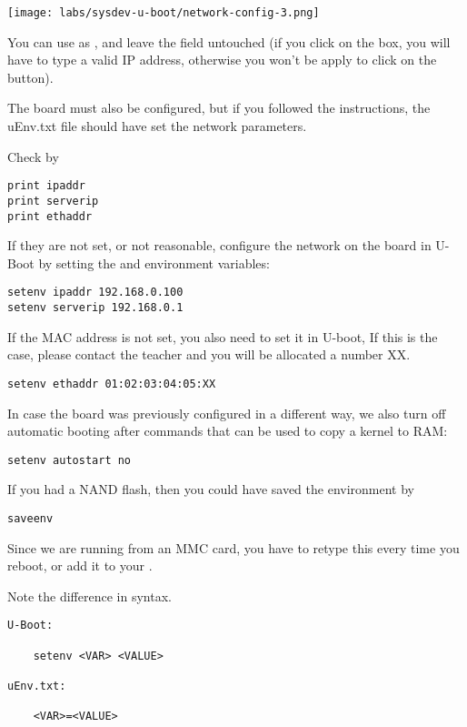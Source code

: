 \begin{center}
\texttt{[image: labs/sysdev-u-boot/network-config-3.png]}
\end{center}

You can use  as , and leave the
 field untouched (if you click on the  box, you
will have to type a valid IP address, otherwise you won't be apply to
click on the  button).

The board must also be configured, but if you followed the instructions,
the uEnv.txt file should have set the  network parameters.

Check by

\begin{verbatim}
print ipaddr
print serverip
print ethaddr
\end{verbatim}

If they are not set, or not reasonable, configure the network on the board in U-Boot by setting the 
and  environment variables:

\begin{verbatim}
setenv ipaddr 192.168.0.100
setenv serverip 192.168.0.1
\end{verbatim}

If the MAC address is not set, you also need to set it in U-boot,
If this is the case, please contact the teacher and you will be allocated
a number XX.

\begin{verbatim}
setenv ethaddr 01:02:03:04:05:XX
\end{verbatim}

In case the board was previously configured in a different way, we
also turn off automatic booting after commands that can be used to
copy a kernel to RAM:

\begin{verbatim}
setenv autostart no
\end{verbatim}

If you had a NAND flash, then you could have saved the environment by

\begin{verbatim}
saveenv
\end{verbatim}

Since we are running from an MMC card, you have to retype this every time you reboot,
or add it to your .

Note the difference in syntax.
\begin{lstlisting}
U-Boot:

	setenv <VAR> <VALUE>

uEnv.txt:

	<VAR>=<VALUE>

\end{lstlisting}



